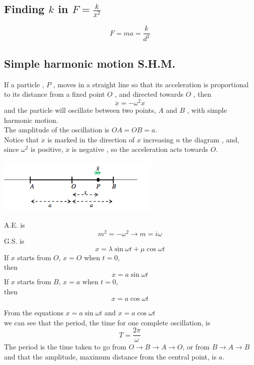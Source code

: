 \documentclass[a4paper]{article}
\begin{document}
\subsection{Finding $k$ in $F=\frac{k}{x^2}$}
\[
	F=ma=\frac{k}{d^2}
\]

\subsection{Simple harmonic motion S.H.M.}

\begin{defi}[S.H.M. equation]
	If a particle
	,
	$P$
	, moves in a straight line so that
	its acceleration is proportional to its distance
	from a fixed point
	$O$
	, and directed towards
	$O$
	,
	then
	\[
		\ddot{x}=-\omega^2x
	\]
	and the particle will oscillate between two points,
	$A$
	and
	$B$
	, with simple harmonic motion.\\

	The amplitude of the oscillation is
	$OA = OB= a$.\\

	Notice that $\ddot{x}$
	is marked
	in the direction of
	$x$
	increasing
	$n$ the diagram
	, and, since
	$\omega^2$
	is
	positive,
	$\ddot{x}$
	is negative
	, so the acceleration acts towards
	$O$.
	\begin{center}
		\includegraphics[scale=0.5]{img_M/12_intro4}
	\end{center}
\end{defi}

\begin{prop}
	A.E. is
	\[
		m^2=-\omega^2 \rightarrow m=i\omega
	\]
	G.S. is
	\[
		x=\lambda \sin \omega t+\mu \cos \omega t
	\]
	If $x$ starts from $O$, $x=O$ when $t=0$, \\
	then
	\[
		x=a \sin\omega t
	\]
	If $x$ starts from $B$, $x=a$ when $t=0$, \\
	then
	\[
		x=a\cos\omega t
	\]
\end{prop}
\begin{defi}
	From the equations $x=a \sin\omega t$ and $x=a\cos\omega t$\\
	we can see that the period, the time for one complete oscillation, is
	\[
		T=\frac{2\pi}{\omega}
	\]
	The period is the time taken to go from $O\rightarrow B\rightarrow A\rightarrow O$, or from $B\rightarrow A \rightarrow B$ and that the
	amplitude, maximum distance from the central point, is $a$.
\end{defi}
\end{document}
